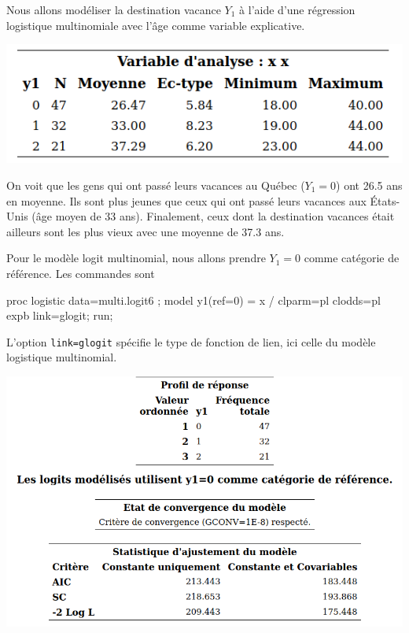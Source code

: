 \documentclass[
  11pt,
  letterpaper,
]{book}
\newenvironment{Shaded}{\begin{snugshade}}{\end{snugshade}}
\newcommand{\NormalTok}[1]{#1}
\theoremstyle{definition}
\theoremstyle{definition}
\theoremstyle{definition}
\theoremstyle{definition}
\theoremstyle{remark}
\begin{document}
Nous allons modéliser la destination vacance \(Y_1\) à l'aide d'une régression logistique multinomiale avec l'âge comme variable explicative.

\begin{center}\includegraphics[width=0.5\linewidth]{figures/03-logistic-e31} \end{center}

On voit que les gens qui ont passé leurs vacances au Québec (\(Y_1=0\)) ont 26.5 ans en moyenne. Ils sont plus jeunes que ceux qui ont passé leurs vacances aux États-Unis (âge moyen de 33 ans). Finalement, ceux dont la destination vacances était ailleurs sont les plus vieux avec une moyenne de 37.3 ans.

Pour le modèle logit multinomial, nous allons prendre \(Y_1=0\) comme catégorie de référence. Les commandes sont

\begin{Shaded}
\begin{Highlighting}[]
\NormalTok{proc logistic data=multi.logit6 ;}
\NormalTok{model y1(ref=\textquotesingle{}0\textquotesingle{}) = x / clparm=pl clodds=pl expb link=glogit;}
\NormalTok{run; }
\end{Highlighting}
\end{Shaded}

L'option \texttt{link=glogit} spécifie le type de fonction de lien, ici celle du modèle logistique multinomial.

\begin{center}\includegraphics[width=0.75\linewidth]{figures/03-logistic-e23} \end{center}
\end{document}
